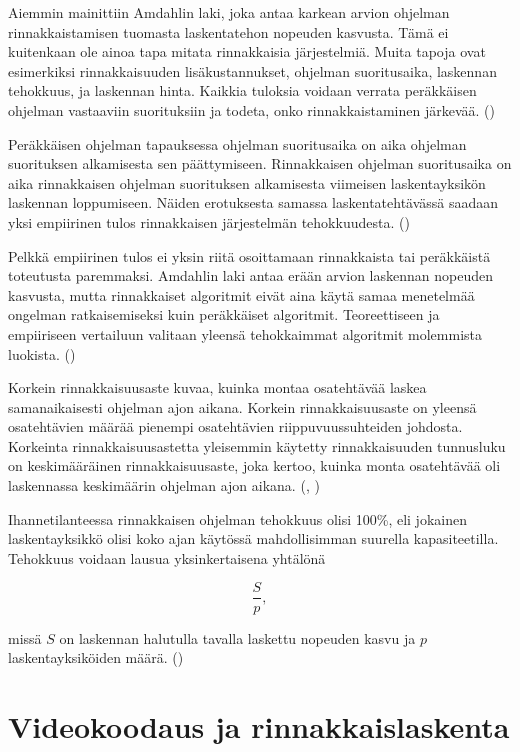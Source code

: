 Aiemmin mainittiin Amdahlin laki, joka antaa karkean arvion ohjelman
rinnakkaistamisen tuomasta laskentatehon nopeuden kasvusta. Tämä ei kuitenkaan
ole ainoa tapa mitata rinnakkaisia järjestelmiä. Muita tapoja ovat esimerkiksi
rinnakkaisuuden lisäkustannukset, ohjelman suoritusaika, laskennan
tehokkuus, ja laskennan hinta. Kaikkia tuloksia voidaan verrata peräkkäisen
ohjelman vastaaviin suorituksiin ja todeta, onko rinnakkaistaminen järkevää.
(\citealt{intro})

Peräkkäisen ohjelman tapauksessa ohjelman suoritusaika on aika ohjelman
suorituksen alkamisesta sen päättymiseen. Rinnakkaisen
ohjelman suoritusaika on aika rinnakkaisen ohjelman suorituksen alkamisesta
viimeisen laskentayksikön laskennan loppumiseen. Näiden
erotuksesta samassa laskentatehtävässä saadaan yksi empiirinen tulos
rinnakkaisen järjestelmän tehokkuudesta. (\citealt{intro})

Pelkkä empiirinen tulos ei yksin riitä osoittamaan rinnakkaista tai peräkkäistä
toteutusta paremmaksi. Amdahlin laki antaa erään arvion laskennan nopeuden
kasvusta, mutta rinnakkaiset algoritmit eivät aina käytä samaa menetelmää
ongelman ratkaisemiseksi kuin peräkkäiset algoritmit. Teoreettiseen ja
empiiriseen vertailuun valitaan yleensä tehokkaimmat algoritmit molemmista
luokista. (\citealt{intro})

Korkein rinnakkaisuusaste kuvaa, kuinka montaa osatehtävää laskea samanaikaisesti
ohjelman ajon aikana. Korkein rinnakkaisuusaste on yleensä osatehtävien määrää
pienempi osatehtävien riippuvuussuhteiden johdosta. Korkeinta
rinnakkaisuusastetta yleisemmin käytetty rinnakkaisuuden tunnusluku on
keskimääräinen rinnakkaisuusaste, joka kertoo, kuinka monta osatehtävää oli
laskennassa keskimäärin ohjelman ajon aikana. (\citealt{intro}, \citealt{rauber})

Ihannetilanteessa rinnakkaisen ohjelman tehokkuus olisi 100\%, eli jokainen
laskentayksikkö olisi koko ajan käytössä mahdollisimman suurella
kapasiteetilla. Tehokkuus voidaan lausua yksinkertaisena yhtälönä

\begin{center}
\begin{equation}\frac{S}{p},\end{equation}
\end{center}

missä $S$ on laskennan halutulla tavalla laskettu nopeuden kasvu ja $p$
laskentayksiköiden määrä. (\citealt{intro})

\section{Videokoodaus ja rinnakkaislaskenta}
\label{chap:parallel_coding}

